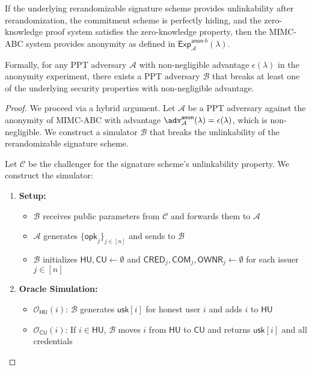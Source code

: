 \begin{theorem}
If the underlying rerandomizable signature scheme provides unlinkability after rerandomization, the commitment scheme is perfectly hiding, and the zero-knowledge proof system satisfies the zero-knowledge property, then the MIMC-ABC system provides anonymity as defined in $\mathsf{Exp}^{\mathsf{anon}\mbox{-}b}_{\mathcal{A}}(\lambda)$.

Formally, for any PPT adversary $\mathcal{A}$ with non-negligible advantage $\epsilon(\lambda)$ in the anonymity experiment, there exists a PPT adversary $\mathcal{B}$ that breaks at least one of the underlying security properties with non-negligible advantage.
\end{theorem}

\begin{proof}
We proceed via a hybrid argument. Let $\mathcal{A}$ be a PPT adversary against the anonymity of MIMC-ABC with advantage $\adv^{\mathsf{anon}}_{\mathcal{A}}(\lambda) = \epsilon(\lambda)$, which is non-negligible. We construct a simulator $\mathcal{B}$ that breaks the unlinkability of the rerandomizable signature scheme.

Let $\mathcal{C}$ be the challenger for the signature scheme's unlinkability property. We construct the simulator:

\begin{enumerate}
    \item \textbf{Setup:}
    \begin{itemize}
        \item $\mathcal{B}$ receives public parameters from $\mathcal{C}$ and forwards them to $\mathcal{A}$
        \item $\mathcal{A}$ generates $\{\mathsf{opk}_j\}_{j \in [n]}$ and sends to $\mathcal{B}$
        \item $\mathcal{B}$ initializes $\mathsf{HU}, \mathsf{CU} \gets \emptyset$ and $\mathsf{CRED}_j, \mathsf{COM}_j, \mathsf{OWNR}_j \gets \emptyset$ for each issuer $j \in [n]$
    \end{itemize}

    \item \textbf{Oracle Simulation:}
    \begin{itemize}
        \item $\mathcal{O}_{\mathsf{HU}}(i)$: $\mathcal{B}$ generates $\mathsf{usk}[i]$ for honest user $i$ and adds $i$ to $\mathsf{HU}$
        
        \item $\mathcal{O}_{\mathsf{CU}}(i)$: If $i \in \mathsf{HU}$, $\mathcal{B}$ moves $i$ from $\mathsf{HU}$ to $\mathsf{CU}$ and returns $\mathsf{usk}[i]$ and all credentials
        

\end{itemize}
\end{enumerate}
\end{proof}

